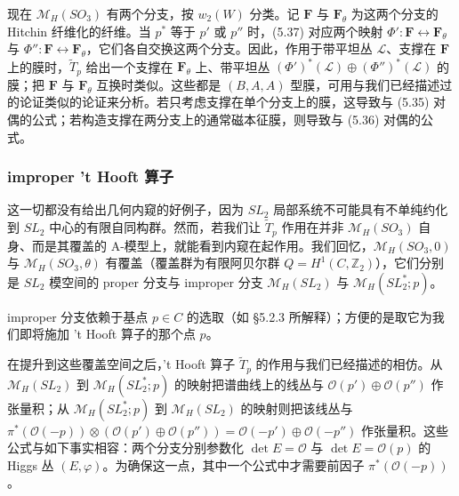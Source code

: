 \documentclass[11pt,a4paper]{article}
\begin{document}
现在 $\mathcal{M}_H(SO_3)$ 有两个分支，按 $w_2(W)$ 分类。记 $\boldsymbol{F}$ 与 $\boldsymbol{F}_\theta$ 为这两个分支的 Hitchin 纤维化的纤维。当 $p^*$ 等于 $p'$ 或 $p''$ 时，(5.37) 对应两个映射 $\Phi':\boldsymbol{F}\leftrightarrow\boldsymbol{F}_\theta$ 与 $\Phi'':\boldsymbol{F}\leftrightarrow\boldsymbol{F}_\theta$，它们各自交换这两个分支。因此，作用于带平坦丛 $\mathcal{L}$、支撑在 $\boldsymbol{F}$ 上的膜时，$\widetilde{T}_p$ 给出一个支撑在 $\boldsymbol{F}_\theta$ 上、带平坦丛 $(\Phi')^*(\mathcal{L})\oplus(\Phi'')^*(\mathcal{L})$ 的膜；把 $\boldsymbol{F}$ 与 $\boldsymbol{F}_\theta$ 互换时类似。这些都是 $(B,A,A)$ 型膜，可用与我们已经描述过的论证类似的论证来分析。若只考虑支撑在单个分支上的膜，这导致与 (5.35) 对偶的公式；若构造支撑在两分支上的通常磁本征膜，则导致与 (5.36) 对偶的公式。

\subsubsection{improper 't Hooft 算子}

这一切都没有给出几何内窥的好例子，因为 $SL_2$ 局部系统不可能具有不单纯约化到 $SL_2$ 中心的有限自同构群。然而，若我们让 $\widetilde{T}_p$ 作用在并非 $\mathcal{M}_H(SO_3)$ 自身、而是其覆盖的 A-模型上，就能看到内窥在起作用。我们回忆，$\mathcal{M}_H(SO_3,0)$ 与 $\mathcal{M}_H(SO_3,\theta)$ 有覆盖（覆盖群为有限阿贝尔群 $Q=H^1(C,\mathbb{Z}_2)$），它们分别是 $SL_2$ 模空间的 proper 分支与 improper 分支
$\mathcal{M}_H(SL_2)$ 与 $\mathcal{M}_H(SL_2^*;p)$。

improper 分支依赖于基点 $p\in C$ 的选取（如 §5.2.3 所解释）；方便的是取它为我们即将施加 't Hooft 算子的那个点 $p$。

在提升到这些覆盖空间之后，'t Hooft 算子 $\widetilde{T}_p$ 的作用与我们已经描述的相仿。从 $\mathcal{M}_H(SL_2)$ 到 $\mathcal{M}_H(SL_2^*;p)$ 的映射把谱曲线上的线丛与 $\mathcal{O}(p')\oplus\mathcal{O}(p'')$ 作张量积；从 $\mathcal{M}_H(SL_2^*;p)$ 到 $\mathcal{M}_H(SL_2)$ 的映射则把该线丛与 $\pi^*(\mathcal{O}(-p))\otimes(\mathcal{O}(p')\oplus\mathcal{O}(p''))=\mathcal{O}(-p')\oplus\mathcal{O}(-p'')$ 作张量积。这些公式与如下事实相容：两个分支分别参数化 $\det E=\mathcal{O}$ 与 $\det E=\mathcal{O}(p)$ 的 Higgs 丛 $(E,\varphi)$。为确保这一点，其中一个公式中才需要前因子 $\pi^*(\mathcal{O}(-p))$。
\end{document}
